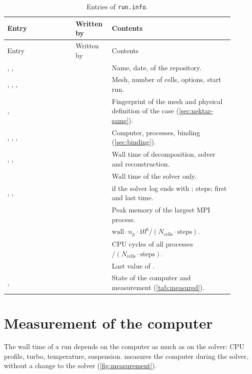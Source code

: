 \begin{longtable}{@{}P{0.28\linewidth} P{0.14\linewidth} P{0.50\linewidth}@{}}
\caption{Entries of \texttt{run.info}.}\label{tab:runinfo}\\
\toprule
Entry & Written by & Contents \\
\midrule
\endfirsthead
\toprule
Entry & Written by & Contents \\
\midrule
\endhead
{}, ,  &  & Name, date,  of the repository. \\
, , ,  &  & Mesh, number of cells, options, start run. \\
,  &  & Fingerprint of the mesh and physical definition of the case (\cref{sec:nektar-same}). \\
, , ,  &  & Computer, processes, binding (\cref{sec:binding}). \\
, ,  &  & Wall time of decomposition, solver and reconstruction. \\
 &  & Wall time of the solver only. \\
, ,  &  &  if the solver log ends with ; steps; first and last time. \\
 &  & Peak memory of the largest MPI process. \\
 &  & $\text{wall}\cdot n_p\cdot10^6/(N_\text{cells}\cdot\text{steps})$. \\
 &  & CPU cycles of all processes $/(N_\text{cells}\cdot\text{steps})$. \\
 &  & Last value of . \\
,  &  & State of the computer and measurement (\cref{tab:measured}). \\
\bottomrule
\end{longtable}

\section{Measurement of the computer}\label{sec:measurement}

The wall time of a run depends on the computer as much as on the solver: CPU
profile, turbo, temperature, suspension.  measures the computer during
the solver, without a change to the solver (\cref{fig:measurement}).


